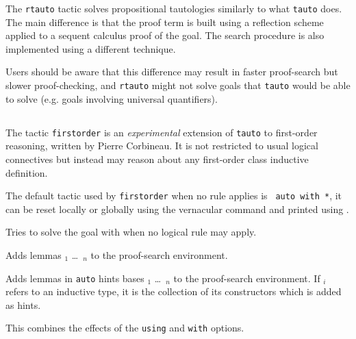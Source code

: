 The {\tt rtauto} tactic solves propositional tautologies similarly to what {\tt tauto} does. The main difference is that the proof term is built using a reflection scheme applied to a sequent calculus proof of the goal. The search procedure is also implemented using a different technique.

Users should be aware that this difference may result in faster proof-search but  slower proof-checking, and {\tt rtauto} might not solve goals that {\tt tauto} would be able to solve (e.g. goals involving universal quantifiers).

\subsection{}
\label{firstorder}

The tactic \texttt{firstorder} is an {\it experimental} extension of
\texttt{tauto} to
first-order reasoning, written by Pierre Corbineau.
It is not restricted to usual logical connectives but
instead may reason about any first-order class inductive definition.

The default tactic used by \texttt{firstorder} when no rule applies is {\tt
  auto with *}, it can be reset locally or globally using the {\nobreak
  {}} 
vernacular command and printed using {}.

\begin{Variants}
 \item {}

   Tries to solve the goal with {\tac} when no logical rule may apply.

 \item {}

   Adds lemmas \ident$_1$ \dots\ \ident$_n$ to the proof-search
   environment.

 \item {}

   Adds lemmas in {\tt auto} hints bases {\qualid}$_1$ \dots\ {\qualid}$_n$
   to the proof-search environment. If {\qualid}$_i$ refers to an inductive
   type, it is the collection of its constructors which is added as hints.

\item {}

  This combines the effects of the {\tt using} and {\tt with} options.

\end{Variants}

